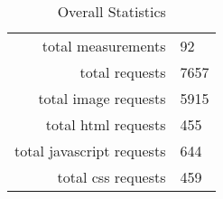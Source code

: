 \begin{table}[h]
\caption{Overall Statistics}\centering
\begin{tabular}{rl}
total measurements & 92\\
total requests & 7657\\
total image requests & 5915\\
total html requests & 455\\
total javascript requests & 644\\
total css requests & 459\\
\end{tabular}
\end{table}
